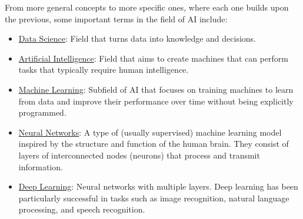 From more general concepts to more specific ones, where each one builds upon the previous, some important terms in the field of AI include:
\begin{itemize}
    \item \ul{Data Science}: Field that turns data into knowledge and decisions.
    \item \ul{Artificial Intelligence}: Field that aims to create machines that can perform tasks that typically require human intelligence.
    \item \ul{Machine Learning}: Subfield of AI that focuses on training machines to learn from data and improve their performance over time without being explicitly programmed. 
    \item \ul{Neural Networks}: A type of (usually supervised) machine learning model inspired by the structure and function of the human brain. They consist of layers of interconnected nodes (neurons) that process and transmit information.
    \item \ul{Deep Learning}: Neural networks with multiple layers. Deep learning has been particularly successful in tasks such as image recognition, natural language processing, and speech recognition.
\end{itemize}
